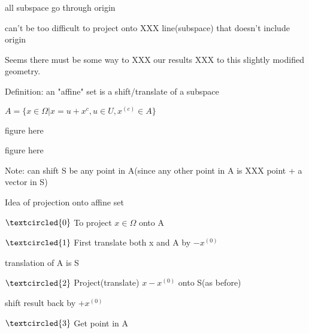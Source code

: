 all subspace go through origin

can't be too difficult to project onto XXX line(subspace) that doesn't include origin

\begin{marginfigure}
	\centering
	\resizebox{7.5cm}{3cm}{}
	\caption{}
	\label{}
\end{marginfigure}

Seems there must be some way to XXX our results XXX to this slightly modified geometry.

\vspace{0.5cm}
Definition: an "affine" set is a shift/translate of a subspace

$A=\{x\in\Omega|x=u+x^{c}, u\in U, x^{(c)}\in A\}$

figure here

figure here

Note: can shift S be any point in A(since any other point in A is XXX point + a vector in S)

Idea of projection onto affine set

$\textcircled{0}$ To project $x\in \Omega$ onto A

$\textcircled{1}$ First translate both x and A by $-x^{(0)}$

translation of A is S

$\textcircled{2}$ Project(translate) $x-x^{(0)}$ onto S(as before)

shift result back by $+x^{(0)}$

$\textcircled{3}$ Get point in A

\begin{marginfigure}
	\centering
	\resizebox{7.5cm}{3cm}{}
	\caption{}
	\label{}
\end{marginfigure}

\begin{marginfigure}
	\centering
	\resizebox{7.5cm}{3cm}{}
	\caption{}
	\label{}
\end{marginfigure}

\begin{marginfigure}
	\centering
	\resizebox{7.5cm}{3cm}{}
	\caption{}
	\label{}
\end{marginfigure}

\begin{marginfigure}
	\centering
	\resizebox{7.5cm}{3cm}{}
	\caption{}
	\label{}
\end{marginfigure}


